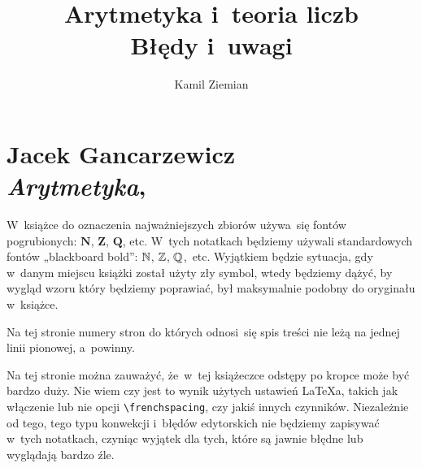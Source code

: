 \documentclass[a4paper,11pt]{article}
\title{Arytmetyka i~teoria liczb \\
  {\Large Błędy i~uwagi}}
\author{Kamil Ziemian}
\numberwithin{equation}{section}
\begin{document}





\maketitle %





\section{ %
  Jacek Gancarzewicz \\
  \textit{Arytmetyka}, \cite{GancarzewiczArytmetyka2000}}

\vspace{0em}



\vspace{0em}


\noindent
W~książce do oznaczenia najważniejszych zbiorów używa~się fontów
pogrubionych: $\mathbf{N}$, $\mathbf{Z}$, $\mathbf{Q}$, etc. W~tych
notatkach będziemy używali standardowych fontów „blackboard bold”: $\mathbb{N}$,
$\mathbb{Z}$, $\mathbb{Q}$,~etc. Wyjątkiem będzie sytuacja, gdy w~danym miejscu
książki został użyty zły symbol, wtedy będziemy dążyć, by wygląd wzoru który
będziemy poprawiać, był maksymalnie podobny do oryginału w~książce.

\vspace{\spaceFour}






\vspace{0em}


\noindent
{} Na tej stronie numery stron do których odnosi~się spis treści nie
leżą na jednej linii pionowej, a~powinny.

\vspace{\spaceFour}





\noindent
{} Na tej stronie można zauważyć, że~w~tej książeczce odstępy po kropce
może być bardzo duży. Nie wiem czy jest to wynik użytych ustawień \LaTeX a,
takich jak włączenie lub nie opcji \texttt{\textbackslash frenchspacing},
czy jakiś innych czynników. Niezależnie od tego, tego typu konwekcji
i~błędów edytorskich nie będziemy zapisywać w~tych notatkach, czyniąc
wyjątek dla tych, które są jawnie błędne lub wyglądają bardzo źle.
\end{document}
